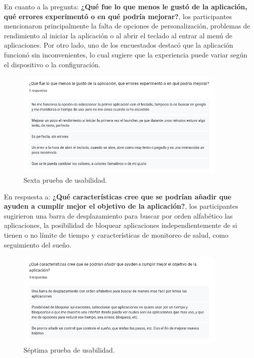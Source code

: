 En cuanto a la pregunta: \textbf{¿Qué fue lo que menos le gustó de la aplicación, qué errores experimentó o en qué podría mejorar?}, los participantes mencionaron principalmente la falta de opciones de personalización, problemas de rendimiento al iniciar la aplicación o al abrir el teclado al entrar al menú de aplicaciones. Por otro lado, uno de los encuestados destacó que la aplicación funcionó sin inconvenientes, lo cual sugiere que la experiencia puede variar según el dispositivo o la configuración.

\begin{figure}[h]
  \caption{Sexta prueba de usabilidad.}
  \label{fig:oportunidades_mejora}
  \includegraphics[width=0.92\textwidth]{Figuras/oportunidades_mejora.png}
  \centering
\end{figure}

En respuesta a: \textbf{¿Qué características cree que se podrían añadir que ayuden a cumplir mejor el objetivo de la aplicación?}, los participantes sugirieron una barra de desplazamiento para buscar por orden alfabético las aplicaciones, la posibilidad de bloquear aplicaciones independientemente de si tienen o no límite de tiempo y características de monitoreo de salud, como seguimiento del sueño.

\begin{figure}[h]
  \caption{Séptima prueba de usabilidad.}
  \label{fig:caracteristicas_adicionales}
  \includegraphics[width=0.92\textwidth]{Figuras/caracteristicas_adicionales.png}
  \centering
\end{figure}

